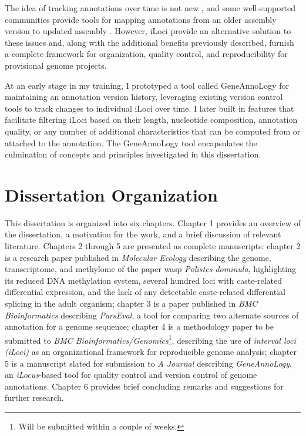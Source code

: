 The idea of tracking annotations over time is not new \cite{Eilbeck}, and some well-supported communities provide tools for mapping annotations from an older assembly version to updated assembly \cite{liftOver,PAGIT}.
However, iLoci provide an alternative solution to these issues and, along with the additional benefits previously described, furnish a complete framework for organization, quality control, and reproducibility for provisional genome projects.

At an early stage in my training, I prototyped a tool called GeneAnnoLogy for maintaining an annotation version history, leveraging existing version control tools to track changes to individual iLoci over time.
I later built in features that facilitate filtering iLoci based on their length, nucleotide composition, annotation quality, or any number of additional characteristics that can be computed from or attached to the annotation.
The GeneAnnoLogy tool encapsulates the culmination of concepts and principles investigated in this dissertation.

\section{Dissertation Organization}

This dissertation is organized into six chapters.
Chapter 1 provides an overview of the dissertation, a motivation for the work, and a brief discussion of relevant literature.
Chapters 2 through 5 are presented as complete manuscripts:
chapter 2 is a research paper published in \textit{Molecular Ecology} describing the genome, transcriptome, and methylome of the paper wasp \textit{Polistes dominula}, highlighting its reduced DNA methylation system, several hundred loci with caste-related differential expression, and the lack of any detectable caste-related differential splicing in the adult organism;
chapter 3 is a paper published in \textit{BMC Bioinformatics} describing \textit{ParsEval}, a tool for comparing two alternate sources of annotation for a genome sequence;
chapter 4 is a methodology paper to be submitted to \textit{BMC Bioinformatics/Genomics}\footnote{Will be submitted within a couple of weeks.}, describing the use of \textit{interval loci (iLoci)} as an organizational framework for reproducible genome analysis;
chapter 5 is a manuscript slated for submission to \textit{A Journal} describing \textit{GeneAnnoLogy}, an \textit{iLocus}-based tool for quality control and version control of genome annotations.
Chapter 6 provides brief concluding remarks and suggestions for further research.
